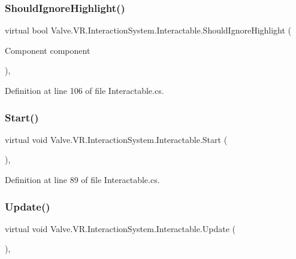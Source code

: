 \subsubsection{\texorpdfstring{ShouldIgnoreHighlight()}{ShouldIgnoreHighlight()}}
{\footnotesize\ttfamily virtual bool Valve.\+V\+R.\+Interaction\+System.\+Interactable.\+Should\+Ignore\+Highlight (\begin{DoxyParamCaption}\item[{Component}]{component }\end{DoxyParamCaption})\hspace{0.3cm}{\ttfamily [protected]}, {\ttfamily [virtual]}}



Definition at line 106 of file Interactable.\+cs.

\mbox{\label{class_valve_1_1_v_r_1_1_interaction_system_1_1_interactable_aef61a645fffad29d9a6865ca38026a89}} 
\subsubsection{\texorpdfstring{Start()}{Start()}}
{\footnotesize\ttfamily virtual void Valve.\+V\+R.\+Interaction\+System.\+Interactable.\+Start (\begin{DoxyParamCaption}{ }\end{DoxyParamCaption})\hspace{0.3cm}{\ttfamily [protected]}, {\ttfamily [virtual]}}



Definition at line 89 of file Interactable.\+cs.

\mbox{\label{class_valve_1_1_v_r_1_1_interaction_system_1_1_interactable_a4da06a25433c660a51df6bcf7caf1c12}} 
\subsubsection{\texorpdfstring{Update()}{Update()}}
{\footnotesize\ttfamily virtual void Valve.\+V\+R.\+Interaction\+System.\+Interactable.\+Update (\begin{DoxyParamCaption}{ }\end{DoxyParamCaption})\hspace{0.3cm}{\ttfamily [protected]}, {\ttfamily [virtual]}}



